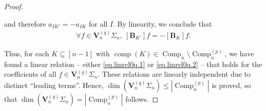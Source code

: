 \documentclass[10pt,a4paper]{amsart}
\newcommand{\BB}{\mathbf{B}} %
\newcommand{\Comp}{\operatorname{Comp}}
\newcommand{\comp}{\operatorname{comp}}
\begin{document}
\begin{proof}
\begin{itemize}
and therefore $a_{IK'} = - a_{IK}$ for all $I$. By linearity, we conclude that
\begin{align}
\label{eq.linrel0q.2}
\forall f \in \mathbf{V}_n^{(q)}\Sigma_n, \ [\BB_{K'}]f = -[\BB_K]f.
\end{align}
\end{itemize}
Thus, for each $K \subseteq [n-1]$ with $\comp(K) \in \Comp_n \setminus \Comp_n^{(p)}$, we have found a linear relation -- either \eqref{eq.linrel0q.1} or \eqref{eq.linrel0q.2} -- that holds for the coefficients of all $f \in \mathbf{V}_n^{(q)}\Sigma_n$.
These relations are linearly independent due to distinct ``leading terms''.
Hence, $\dim\left(\mathbf{V}_n^{(q)}\Sigma_n\right) \leq |\Comp_n^{(p)}|$ is proved,
so that $\dim\left(\mathbf{V}_n^{(q)}\Sigma_n\right) = |\Comp_n^{(p)}|$ follows.
\end{proof}
\end{document}
